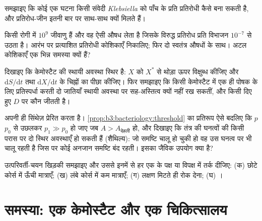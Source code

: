 \begin{exercise}[$\star\star$]\label{exo:b3:bacteriology:8}
समझाइए कि कोई एक  घटना किसी संवेदी \emph{Klebsiella} को पाँच
 के प्रति प्रतिरोधी कैसे बना सकती है, और प्रतिरोध-जीन इतनी
बार  पर साथ-साथ क्यों मिलते हैं।
\end{exercise}

\begin{exercise}[$\star\star$]\label{exo:b3:bacteriology:9}
किसी रोगी में $10^{9}$ जीवाणु हैं और वह ऐसी औषध लेता है जिसके विरुद्ध
प्रतिरोध प्रति विभाजन $10^{-7}$ से उठता है। आरंभ पर प्रत्याशित
प्रतिरोधी कोशिकाएँ निकालिए; फिर दो स्वतंत्र औषधों के साथ। अटल कोशिकाएँ
एक भिन्न समस्या क्यों हैं?
\end{exercise}

\begin{exercise}[$\star\star\star$]\label{exo:b3:bacteriology:10}
दिखाइए कि केमोस्टैट की स्थायी अवस्था स्थिर है: $X$ को $X^{*}$ से
थोड़ा ऊपर विक्षुब्ध कीजिए और $\mathrm{d}S/\mathrm{d}t$ तथा
$\mathrm{d}X/\mathrm{d}t$ के चिह्नों का पीछा कीजिए। फिर समझाइए कि किसी
केमोस्टैट में एक ही पोषक के लिए प्रतिस्पर्धा करती दो जातियाँ स्थायी
अवस्था पर सह-अस्तित्व क्यों नहीं रख सकतीं, और किसी दिए हुए $D$ पर कौन जीतती है।
\end{exercise}

\begin{exercise}[$\star\star\star$]\label{exo:b3:bacteriology:11}
 अपनी ही सिंथेज़ प्रेरित करता है।
\cref{prop:b3:bacteriology:threshold} का प्रतिरूप ऐसे बदलिए कि $p$
$p_{0}$ से उछलकर
$p_{1} \gg p_{0}$ हो जाए जब $A > A_{\text{देहली}}$ हो, और दिखाइए कि तंत्र की घनत्वों की किसी परास पर
दो स्थिर अवस्थाएँ हो सकती हैं (शैथिल्य): जो समष्टि चालू हो चुकी हो वह
उस घनत्व पर भी चालू रहती है जिस पर कोई अनजान समष्टि बंद रहती। इसका
जैविक उपयोग क्या है?
\end{exercise}

\begin{exercise}[$\star\star\star$]\label{exo:b3:bacteriology:12}
उत्परिवर्ती-चयन खिड़की समझाइए और उससे इनमें से हर एक के पक्ष या विपक्ष
में तर्क दीजिए: (क) छोटे कोर्स में ऊँची मात्राएँ; (ख) लंबे कोर्स में
कम मात्राएँ; (ग) लक्षण मिटते ही रोक देना; (घ) ।
\end{exercise}

\section{समस्या: एक केमोस्टैट और एक चिकित्सालय}


